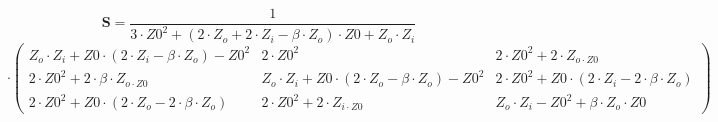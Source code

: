 \[ \mathbf{S}=\frac{1}{3\cdot Z0^2+\left(2\cdot Z_o+2\cdot
Z_i-\beta\cdot Z_o\right)\cdot Z0+Z_o\cdot Z_i} \]
\[ \cdot \left(\begin{smallmatrix} Z_o\cdot Z_i+Z0\cdot \left(2\cdot
Z_i-\beta\cdot Z_o\right)-Z0^2 & 2\cdot Z0^2 & 2\cdot Z0^2+2\cdot
Z_{o\cdot Z0} \\ 2\cdot Z0^2+2\cdot \beta\cdot Z_{o\cdot Z0} &
Z_o\cdot Z_i+Z0\cdot \left(2\cdot Z_o-\beta\cdot Z_o\right)-Z0^2 &
2\cdot Z0^2+Z0\cdot \left(2\cdot Z_i-2\cdot \beta\cdot Z_o\right) \\
2\cdot Z0^2+Z0\cdot \left(2\cdot Z_o-2\cdot \beta\cdot Z_o\right) &
2\cdot Z0^2+2\cdot Z_{i\cdot Z0} & Z_o\cdot Z_i-Z0^2+\beta\cdot
Z_o\cdot Z0 \end{smallmatrix}\right) \]
